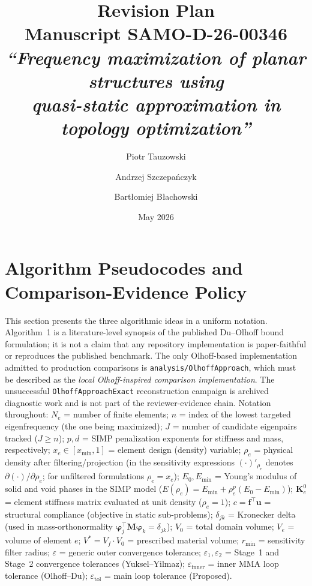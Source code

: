 \documentclass[12pt,a4paper]{article}
\title{\textbf{Revision Plan}\\[4pt]
\large Manuscript SAMO-D-26-00346\\
\textit{``Frequency maximization of planar structures using\\quasi-static approximation in topology optimization''}}
\author{Piotr Tauzowski \and Andrzej Szczepańczyk \and Bartłomiej Błachowski}
\date{May 2026}
\begin{document}
\maketitle

\section{Algorithm Pseudocodes and Comparison-Evidence Policy}
\label{sec:algorithms}

This section presents the three algorithmic ideas in a uniform notation.
Algorithm~1 is a literature-level synopsis of the published Du--Olhoff
bound formulation; it is not a claim that any repository implementation is
paper-faithful or reproduces the published benchmark.  The only Olhoff-based
implementation admitted to production comparisons is
\texttt{analysis/OlhoffApproach}, which must be described as the
\emph{local Olhoff-inspired comparison implementation}.  The unsuccessful
\texttt{OlhoffApproachExact} reconstruction campaign is archived diagnostic
work and is not part of the reviewer-evidence chain.
Notation throughout:
$N_e$ = number of finite elements;
$n$ = index of the lowest targeted eigenfrequency (the one being maximized);
$J$ = number of candidate eigenpairs tracked ($J \geq n$);
$p,d$ = SIMP penalization exponents for stiffness and mass, respectively;
$x_e \in [x_{\min},1]$ = element design (density) variable;
$\rho_e$ = physical density after filtering/projection
  (in the sensitivity expressions $(\cdot)'_{\rho_e}$ denotes
  $\partial(\cdot)/\partial\rho_e$; for unfiltered formulations $\rho_e = x_e$);
$E_0, E_{\min}$ = Young's modulus of solid and void phases in the SIMP model
  ($E(\rho_e)=E_{\min}+\rho_e^p(E_0-E_{\min})$);
$\mathbf{K}_e^0$ = element stiffness matrix evaluated at unit density ($\rho_e=1$);
$c = \mathbf{f}^\top\mathbf{u}$ = structural compliance (objective in static sub-problems);
$\delta_{jk}$ = Kronecker delta (used in mass-orthonormality $\boldsymbol{\varphi}_j^\top\mathbf{M}\boldsymbol{\varphi}_k=\delta_{jk}$);
$V_0$ = total domain volume;
$V_e$ = volume of element $e$;
$V^* = V_f\cdot V_0$ = prescribed material volume;
$r_{\min}$ = sensitivity filter radius;
$\varepsilon$ = generic outer convergence tolerance;
$\varepsilon_1,\varepsilon_2$ = Stage~1 and Stage~2 convergence tolerances (Yuksel--Yilmaz);
$\varepsilon_{\mathrm{inner}}$ = inner MMA loop tolerance (Olhoff--Du);
$\varepsilon_{\mathrm{tol}}$ = main loop tolerance (Proposed).
\end{document}
